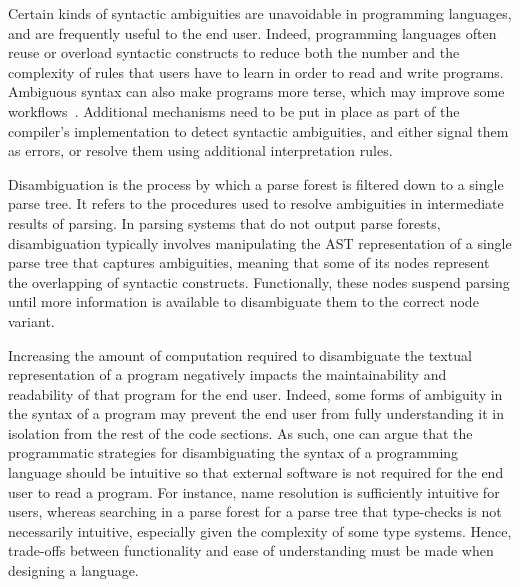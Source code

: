 Certain kinds of syntactic ambiguities are unavoidable in programming languages, and are frequently useful to the end user.
Indeed, programming languages often reuse or overload syntactic constructs to reduce both the number and the complexity of rules that users have to learn in order to read and write programs.
Ambiguous syntax can also make programs more terse, which may improve some workflows~\cite{resolveAmbiguity}.
Additional mechanisms need to be put in place as part of the compiler's implementation to detect syntactic ambiguities, and either signal them as errors, or resolve them using additional interpretation rules.


Disambiguation is the process by which a parse forest is filtered down to a single parse tree.
It refers to the procedures used to resolve ambiguities in intermediate results of parsing.
In parsing systems that do not output parse forests, disambiguation typically involves manipulating the \ac{AST} representation of a single parse tree that captures ambiguities, meaning that some of its nodes represent the overlapping of syntactic constructs.
Functionally, these nodes suspend parsing until more information is available to disambiguate them to the correct node variant.


Increasing the amount of computation required to disambiguate the textual representation of a program negatively impacts the maintainability and readability of that program for the end user.
Indeed, some forms of ambiguity in the syntax of a program may prevent the end user from fully understanding it in isolation from the rest of the code sections.
As such, one can argue that the programmatic strategies for disambiguating the syntax of a programming language should be intuitive so that external software is not required for the end user to read a program.
For instance, name resolution is sufficiently intuitive for users, whereas searching in a parse forest for a parse tree that type-checks is not necessarily intuitive, especially given the complexity of some type systems.
Hence, trade-offs between functionality and ease of understanding must be made when designing a language.


